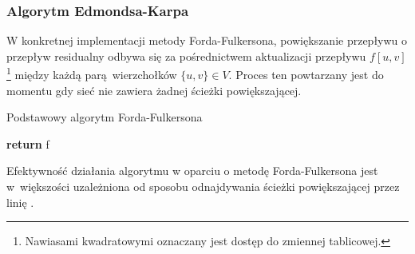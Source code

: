 \subsubsection{\textbf{Algorytm Edmondsa-Karpa}}
W konkretnej implementacji metody Forda-Fulkersona, powiększanie przepływu o przepływ residualny odbywa się za pośrednictwem aktualizacji przepływu $f[u,v]$\footnote{Nawiasami kwadratowymi oznaczany jest dostęp do zmiennej tablicowej.} między każdą parą wierzchołków $\{u,v\} \in V$.
Proces ten powtarzany jest do momentu gdy sieć nie zawiera żadnej ścieżki powiększającej.
\par{
  \begin{algorithm}
    \caption{Podstawowy algorytm Forda-Fulkersona}\label{alg_fordFulkersonConcrete}
    \begin{algorithmic}[1]




        \EndFor
        \label{shortestPath}


          \EndFor
        \EndWhile
        \State\textbf{return} f
      \EndFunction
    \end{algorithmic}
  \end{algorithm}
  Efektywność działania algorytmu w oparciu o metodę Forda-Fulkersona jest w~większości uzależniona od sposobu odnajdywania ścieżki powiększającej przez linię .
  }
